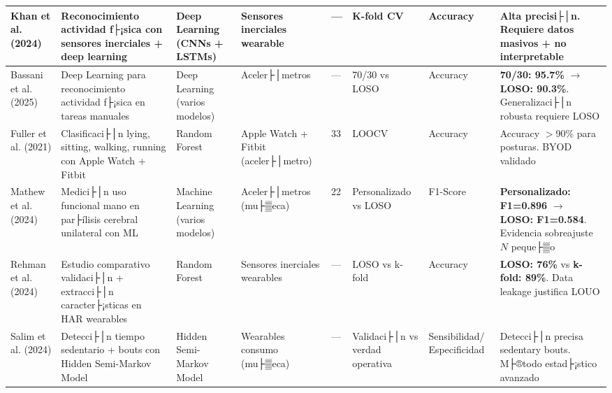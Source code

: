 \begin{landscape}
\begin{longtable}{@{}p{1.8cm}p{2.5cm}p{1.8cm}p{1.5cm}p{0.9cm}p{1.3cm}p{2.0cm}p{1.8cm}@{}}
\midrule


Khan et al. (2024) \cite{Khan2024Wearable} & 
Reconocimiento actividad f├¡sica con sensores inerciales + deep learning & 
Deep Learning (CNNs + LSTMs) & 
Sensores inerciales wearable & 
--- & 
K-fold CV & 
Accuracy & 
Alta precisi├│n. Requiere datos masivos + no interpretable \\

\midrule

Bassani et al. (2025) \cite{Bassani2025DLHAR} & 
Deep Learning para reconocimiento actividad f├¡sica en tareas manuales & 
Deep Learning (varios modelos) & 
Aceler├│metros & 
--- & 
70/30 vs LOSO & 
Accuracy & 
\textbf{70/30: 95.7\%} $\rightarrow$ \textbf{LOSO: 90.3\%}. Generalizaci├│n robusta requiere LOSO \\

\midrule


Fuller et al. (2021) \cite{Fuller2021Predicting} & 
Clasificaci├│n lying, sitting, walking, running con Apple Watch + Fitbit & 
Random Forest & 
Apple Watch + Fitbit (aceler├│metro) & 
33 & 
LOOCV & 
Accuracy & 
Accuracy $>$90\% para posturas. BYOD validado \\

\midrule

Mathew et al. (2024) \cite{Mathew2024LOSO} & 
Medici├│n uso funcional mano en par├ílisis cerebral unilateral con ML & 
Machine Learning (varios modelos) & 
Aceler├│metros (mu├▒eca) & 
22 & 
Personalizado vs LOSO & 
F1-Score & 
\textbf{Personalizado: F1=0.896} $\rightarrow$ \textbf{LOSO: F1=0.584}. Evidencia sobreajuste $N$ peque├▒o \\

\midrule

Rehman et al. (2024) \cite{Rehman2024LOSO} & 
Estudio comparativo validaci├│n + extracci├│n caracter├¡sticas en HAR wearables & 
Random Forest & 
Sensores inerciales wearables & 
--- & 
LOSO vs k-fold & 
Accuracy & 
\textbf{LOSO: 76\%} vs \textbf{k-fold: 89\%}. Data leakage justifica LOUO \\

\midrule


Salim et al. (2024) \cite{Salim2024STEPHEN} & 
Detecci├│n tiempo sedentario + bouts con Hidden Semi-Markov Model & 
Hidden Semi-Markov Model & 
Wearables consumo (mu├▒eca) & 
--- & 
Validaci├│n vs verdad operativa & 
Sensibilidad/ Especificidad & 
Detecci├│n precisa sedentary bouts. M├®todo estad├¡stico avanzado \\


\end{longtable}
\end{landscape}
